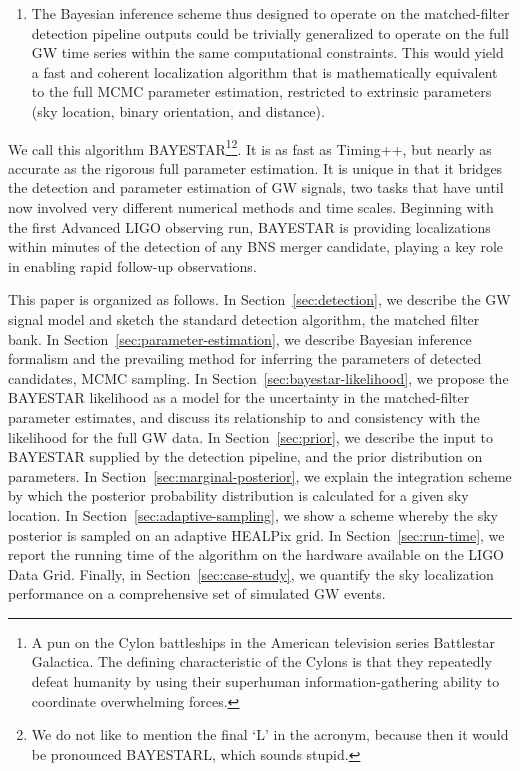 \documentclass[amsmath,amssymb,aps,prx,reprint,nopreprintnumbers,nofootinbib,showpacs]{revtex4-1}
\begin{document}
\begin{enumerate}
    \item The Bayesian inference scheme thus designed to operate on the matched\nobreakdashes-filter detection pipeline outputs could be trivially generalized to operate on the full \ac{GW} time series within the same computational constraints. This would yield a fast and coherent localization algorithm that is mathematically equivalent to the full \ac{MCMC} parameter estimation, restricted to extrinsic parameters (sky location, binary orientation, and distance).
\end{enumerate}
%
We call this algorithm \ac{BAYESTAR}\footnote{A pun on the Cylon battleships in the American television series Battlestar Galactica. The defining characteristic of the Cylons is that they repeatedly defeat humanity by using their superhuman information\nobreakdashes-gathering ability to coordinate overwhelming forces.}\footnote{We do not like to mention the final `L' in the acronym, because then it would be pronounced BAYESTARL, which sounds stupid.}. It is as fast as Timing++, but nearly as accurate as the rigorous full parameter estimation. It is unique in that it bridges the detection and parameter estimation of \ac{GW} signals, two tasks that have until now involved very different numerical methods and time scales. Beginning with the first Advanced \acs{LIGO} observing run, \ac{BAYESTAR} is providing localizations within minutes of the detection of any \ac{BNS} merger candidate, playing a key role in enabling rapid follow-up observations.

This paper is organized as follows. In Section~\ref{sec:detection}, we describe the \ac{GW} signal model and sketch the standard detection algorithm, the matched filter bank. In Section~\ref{sec:parameter-estimation}, we describe Bayesian inference formalism and the prevailing method for inferring the parameters of detected candidates, \ac{MCMC} sampling. In Section~\ref{sec:bayestar-likelihood}, we propose the \ac{BAYESTAR} likelihood as a model for the uncertainty in the matched\nobreakdashes-filter parameter estimates, and discuss its relationship to and consistency with the likelihood for the full \ac{GW} data. In Section~\ref{sec:prior}, we describe the input to \ac{BAYESTAR} supplied by the detection pipeline, and the prior distribution on parameters. In Section~\ref{sec:marginal-posterior}, we explain the integration scheme by which the posterior probability distribution is calculated for a given sky location. In Section~\ref{sec:adaptive-sampling}, we show a scheme whereby the sky posterior is sampled on an adaptive \acs{HEALPix} grid. In Section~\ref{sec:run-time}, we report the running time of the algorithm on the hardware available on the \ac{LIGO} Data Grid. Finally, in Section~\ref{sec:case-study}, we quantify the sky localization performance on a comprehensive set of simulated \ac{GW} events.
\end{document}
